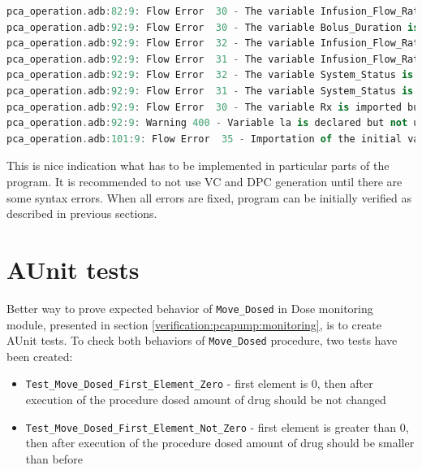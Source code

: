 \singlespacing
\begin{lstlisting}[language=ada, frame=single, gobble=0, caption={Flow errors returned by Examiner for \lstinline{Pca_Operation} package body}, label={listing:verification:pca_generated:flow_errors}]
pca_operation.adb:82:9: Flow Error  30 - The variable Infusion_Flow_Rate is imported but neither referenced nor exported.
pca_operation.adb:92:9: Flow Error  30 - The variable Bolus_Duration is imported but neither referenced nor exported.
pca_operation.adb:92:9: Flow Error  32 - The variable Infusion_Flow_Rate is neither imported nor defined.
pca_operation.adb:92:9: Flow Error  31 - The variable Infusion_Flow_Rate is exported but not (internally) defined.
pca_operation.adb:92:9: Flow Error  32 - The variable System_Status is neither imported nor defined.
pca_operation.adb:92:9: Flow Error  31 - The variable System_Status is exported but not (internally) defined.
pca_operation.adb:92:9: Flow Error  30 - The variable Rx is imported but neither referenced nor exported.
pca_operation.adb:92:9: Warning 400 - Variable la is declared but not used.
pca_operation.adb:101:9: Flow Error  35 - Importation of the initial value of variable Ada.Real_Time.ClockTime is ineffective.
\end{lstlisting}
\doublespacing

This is nice indication what has to be implemented in particular parts of the program. It is recommended to not use VC and DPC generation until there are some syntax errors. When all errors are fixed, program can be initially verified as described in previous sections.


\section{AUnit tests}
\label{verification:aunit}

Better way to prove expected behavior of \lstinline{Move_Dosed} in Dose monitoring module, presented in section \ref{verification:pcapump:monitoring}, is to create AUnit tests. To check both behaviors of \lstinline{Move_Dosed} procedure, two tests have been created:
\begin{itemize}
    \item \lstinline{Test_Move_Dosed_First_Element_Zero} - first element is 0, then after execution of the procedure dosed amount of drug should be not changed
    \item \lstinline{Test_Move_Dosed_First_Element_Not_Zero} - first element is greater than 0, then after execution of the procedure dosed amount of drug should be smaller than before
\end{itemize}

